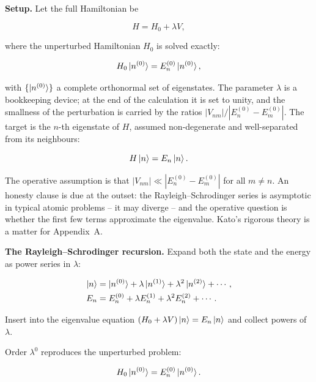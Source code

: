 \medskip\noindent\textbf{Setup.}
Let the full Hamiltonian be
\begin{linenomath}
\begin{equation}
H = H_{0} + \lambda V,
\label{eq:rs-ansatz}
\end{equation}
\end{linenomath}
where the unperturbed Hamiltonian $H_{0}$ is solved exactly:
\begin{linenomath}
\begin{equation*}
H_{0}\ket{n^{(0)}} = E_{n}^{(0)}\ket{n^{(0)}},
\end{equation*}
\end{linenomath}
with $\{\ket{n^{(0)}}\}$ a complete orthonormal set of eigenstates. The parameter $\lambda$ is a bookkeeping device; at the end of the calculation it is set to unity, and the smallness of the perturbation is carried by the ratios $|V_{nm}|/|E_n^{(0)}-E_m^{(0)}|$. The target is the $n$-th eigenstate of $H$, assumed non-degenerate and well-separated from its neighbours:
\begin{linenomath}
\begin{equation*}
H\ket{n} = E_{n}\ket{n}.
\end{equation*}
\end{linenomath}

The operative assumption is that $|V_{nm}| \ll |E_n^{(0)}-E_m^{(0)}|$ for all $m \neq n$. An honesty clause is due at the outset: the Rayleigh--Schrodinger series is asymptotic in typical atomic problems -- it may diverge -- and the operative question is whether the first few terms approximate the eigenvalue. Kato's rigorous theory is a matter for Appendix~A.

\medskip\noindent\textbf{The Rayleigh--Schrodinger recursion.}
Expand both the state and the energy as power series in $\lambda$:
\begin{linenomath}
\begin{align}
\ket{n} &= \ket{n^{(0)}} + \lambda\ket{n^{(1)}} + \lambda^{2}\ket{n^{(2)}} + \cdots, \\
E_{n} &= E_{n}^{(0)} + \lambda E_{n}^{(1)} + \lambda^{2}E_{n}^{(2)} + \cdots .
\end{align}
\end{linenomath}
Insert into the eigenvalue equation $(H_{0}+\lambda V)\ket{n}=E_{n}\ket{n}$ and collect powers of $\lambda$.

Order $\lambda^{0}$ reproduces the unperturbed problem:
\begin{linenomath}
\begin{equation*}
H_{0}\ket{n^{(0)}} = E_{n}^{(0)}\ket{n^{(0)}}.
\end{equation*}
\end{linenomath}

